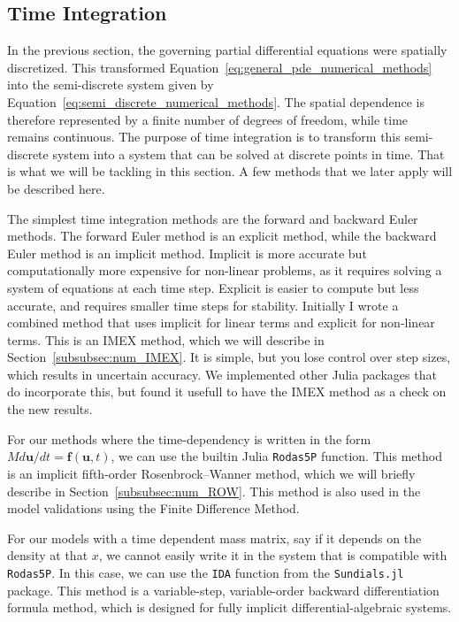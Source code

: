 \subsection{Time Integration}\label{subseq:time_integrations}

In the previous section, the governing partial differential equations were spatially discretized. This transformed Equation~\ref{eq:general_pde_numerical_methods} into the semi-discrete system given by Equation~\ref{eq:semi_discrete_numerical_methods}. The spatial dependence is therefore represented by a finite number of degrees of freedom, while time remains continuous. The purpose of time integration is to transform this semi-discrete system into a system that can be solved at discrete points in time. That is what we will be tackling in this section. A few methods that we later apply will be described here.

The simplest time integration methods are the forward and backward Euler methods. The forward Euler method is an explicit method, while the backward Euler method is an implicit method. Implicit is more accurate but computationally more expensive for non-linear problems, as it requires solving a system of equations at each time step. Explicit is easier to compute but less accurate, and requires smaller time steps for stability. Initially I wrote a combined method that uses implicit for linear terms and explicit for non-linear terms. This is an IMEX method, which we will describe in Section~\ref{subsubsec:num_IMEX}. It is simple, but you lose control over step sizes, which results in uncertain accuracy. We implemented other Julia packages that do incorporate this, but found it usefull to have the IMEX method as a check on the new results.

For our methods where the time-dependency is written in the form $Md\mathbf{u}/dt = \mathbf{f}(\mathbf{u},t)$, we can use the builtin Julia \texttt{Rodas5P} function. This method is an implicit fifth-order Rosenbrock--Wanner method, which we will briefly describe in Section~\ref{subsubsec:num_ROW}. This method is also used in the model validations using the Finite Difference Method.

For our models with a time dependent mass matrix, say if it depends on the density at that $x$, we cannot easily write it in the system that is compatible with \texttt{Rodas5P}. In this case, we can use the \texttt{IDA} function from the \texttt{Sundials.jl} package. This method is a variable-step, variable-order backward differentiation formula method, which is designed for fully implicit differential-algebraic systems.

